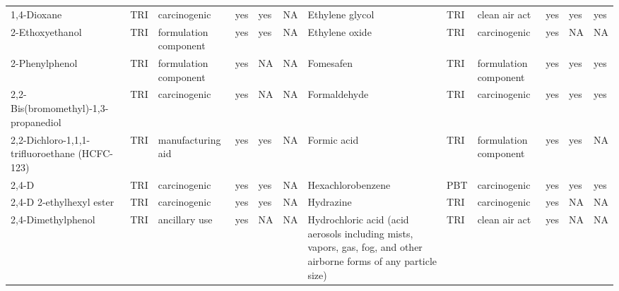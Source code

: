 \begin{table}[H]
{\begin{tabular}{llllllllllll}
            1,4-Dioxane                                                                & TRI            & carcinogenic          & yes    & yes     & NA   & Ethylene glycol                                                                                                    & TRI            & clean air act         & yes    & yes & yes\\
            2-Ethoxyethanol                                                            & TRI            & formulation component & yes    & yes     & NA   & Ethylene oxide                                                                                                     & TRI            & carcinogenic & yes & NA & NA\\
            2-Phenylphenol                                                             & TRI            & formulation component & yes    & NA      & NA   & Fomesafen                                                                                                          & TRI            & formulation component & yes & yes & yes\\
            2,2-Bis(bromomethyl)-1,3-propanediol                                       & TRI            & carcinogenic          & yes    & NA      & NA   & Formaldehyde                                                                                                       & TRI & carcinogenic & yes & yes & yes\\
            2,2-Dichloro-1,1,1-trifluoroethane (HCFC-123)                              & TRI            & manufacturing aid     & yes    & yes     & NA   & Formic acid & TRI & formulation component & yes & yes & NA\\
            2,4-D                                                                      & TRI            & carcinogenic          & yes    & yes     & NA   & Hexachlorobenzene                                                                                                  & PBT            & carcinogenic          & yes    & yes     & yes  \\
            2,4-D 2-ethylhexyl ester                                                   & TRI            & carcinogenic          & yes    & yes     & NA   & Hydrazine                                                                                                          & TRI            & carcinogenic          & yes & NA & NA\\
            2,4-Dimethylphenol                                                         & TRI            & ancillary use         & yes    & NA      & NA   & Hydrochloric acid (acid aerosols including mists, vapors, gas, fog, and other airborne forms of any particle size) & TRI & clean air act & yes & NA & NA\\

\end{tabular}}
\end{table}
